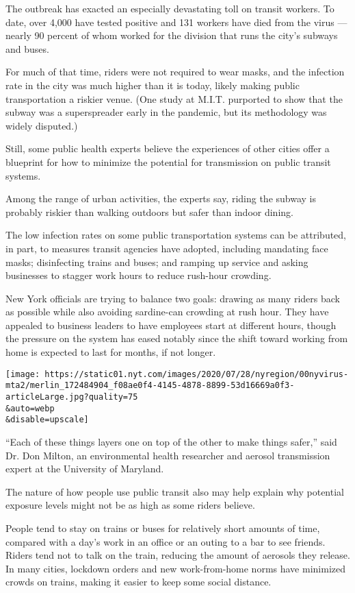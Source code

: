 The outbreak has exacted an especially devastating toll on transit
workers. To date, over 4,000 have tested positive and 131 workers have
died from the virus --- nearly 90 percent of whom worked for the
division that runs the city's subways and buses.

For much of that time, riders were not required to wear masks, and the
infection rate in the city was much higher than it is today, likely
making public transportation a riskier venue. (One study at M.I.T.
purported to show that the subway was a superspreader early in the
pandemic, but its methodology was widely disputed.)

Still, some public health experts believe the experiences of other
cities offer a blueprint for how to minimize the potential for
transmission on public transit systems.

Among the range of urban activities, the experts say, riding the subway
is probably riskier than walking outdoors but safer than indoor dining.

The low infection rates on some public transportation systems can be
attributed, in part, to measures transit agencies have adopted,
including mandating face masks; disinfecting trains and buses; and
ramping up service and asking businesses to stagger work hours to reduce
rush-hour crowding.

New York officials are trying to balance two goals: drawing as many
riders back as possible while also avoiding sardine-can crowding at rush
hour. They have appealed to business leaders to have employees start at
different hours, though the pressure on the system has eased notably
since the shift toward working from home is expected to last for months,
if not longer.

\texttt{[image: https://static01.nyt.com/images/2020/07/28/nyregion/00nyvirus-mta2/merlin\_172484904\_f08ae0f4-4145-4878-8899-53d16669a0f3-articleLarge.jpg?quality=75\\\&auto=webp\\\&disable=upscale]}

``Each of these things layers one on top of the other to make things
safer,'' said Dr. Don Milton, an environmental health researcher and
aerosol transmission expert at the University of Maryland.

The nature of how people use public transit also may help explain why
potential exposure levels might not be as high as some riders believe.

People tend to stay on trains or buses for relatively short amounts of
time, compared with a day's work in an office or an outing to a bar to
see friends. Riders tend not to talk on the train, reducing the amount
of aerosols they release. In many cities, lockdown orders and new
work-from-home norms have minimized crowds on trains, making it easier
to keep some social distance.

